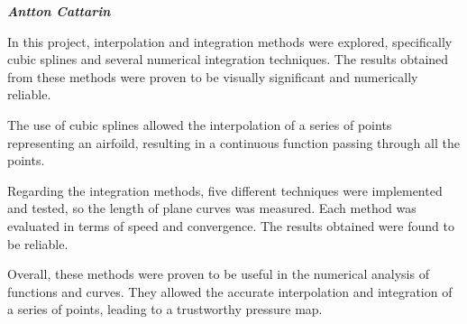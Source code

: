 \large \emph{\textbf{Antton Cattarin}}

In this project, interpolation and integration methods were explored, specifically cubic splines and several numerical integration techniques. The results obtained from these methods were proven to be visually significant and numerically reliable.

The use of cubic splines allowed the interpolation of a series of points representing an airfoild, resulting in a continuous function passing through all the points.

Regarding the integration methods, five different techniques were implemented and tested, so the length of plane curves was measured. Each method was evaluated in terms of speed and convergence. The results obtained were found to be reliable.

Overall, these methods were proven to be useful in the numerical analysis of functions and curves. They allowed the accurate interpolation and integration of a series of points, leading to a trustworthy pressure map.
